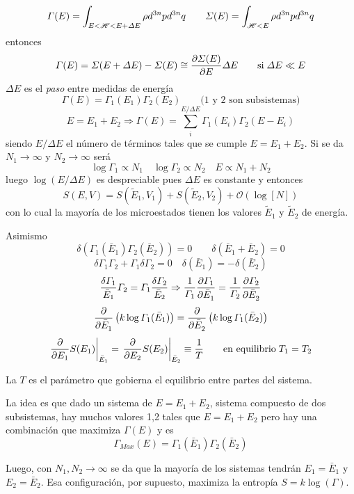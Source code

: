 \documentclass[10pt,oneside]{CBFT_book}
\begin{document}
\[
	\Gamma(E) = \int_{E < \mathscr{H} < E + \Delta E} \rho d^{3n}p d^{3n}q \qquad 
	\Sigma(E) = \int_{\mathscr{H} < E} \rho d^{3n}p d^{3n}q
\]
entonces 
\[
	\Gamma(E) = \Sigma( E + \Delta E ) - \Sigma( E ) \cong \frac{\partial^{\hspace{-0.05em}} {\Sigma( E )}}{\partial {E}^{\hspace{-0.05em}}}\Delta E  
	\qquad \text{si}\; \Delta E \ll E
\]
$\Delta E$ es el {\it paso} entre medidas de energía 
\[
	\Gamma(E) = \Gamma_1(E_1) \Gamma_2(E_2) \qquad \text{(1 y 2 son subsistemas)}
\]
\[
	E = E_1 + E_2 \Rightarrow \Gamma(E) = \sum_i^{E/\Delta E} \Gamma_1(E_i)\Gamma_2(E-E_i)
\]
siendo $E/\Delta E$ el número de términos tales que se cumple $ E = E_1 + E_2 $.
Si se da $ N_1 \to \infty $ y $ N_2 \to \infty $ será
\[
	\log \Gamma_1 \propto N_1 \quad \log \Gamma_2 \propto N_2 \quad E \propto N_1 + N_2
\]
luego $\log(E/\Delta E)$ es despreciable pues $\Delta E$ es constante y entonces
\[
	S(E,V) = S(\tilde{E}_1,V_1) + S(\tilde{E}_2,V_2) + \mathcal{O}(\log[N])
\]
con lo cual la mayoría de los microestados tienen los valores $\tilde{E}_1$ y $\tilde{E}_2$ de energía.

Asimismo
\[
	\delta( \Gamma_1(\bar{E}_1)  \Gamma_2(\bar{E}_2) ) = 0 \qquad \delta( \bar{E}_1 + \bar{E}_2 ) = 0
\]
\[
	\delta\Gamma_1 \Gamma_2 + \Gamma_1 \delta \Gamma_2 = 0 \quad \delta( \bar{E}_1 ) = -\delta ( \bar{E}_2 )
\]
\[
	\frac{\delta\Gamma_1}{\bar{E}_1}\Gamma_2 = \Gamma_1\frac{\delta\Gamma_2}{\bar{E}_2} \Rightarrow 
	\frac{1}{\Gamma_1} \frac{\partial^{\hspace{-0.05em}} {\Gamma_1}}{\partial {\bar{E}_1}^{\hspace{-0.05em}}} = \frac{1}{\Gamma_2} \frac{\partial^{\hspace{-0.05em}} {\Gamma_2}}{\partial {\bar{E}_2}^{\hspace{-0.05em}}} 
\]
\[
	\frac{\partial^{\hspace{-0.05em}} {}}{\partial {\bar{E}_1}^{\hspace{-0.05em}}}\left( k\log \Gamma_1(\bar{E}_1) \right) = 
	\frac{\partial^{\hspace{-0.05em}} {}}{\partial {\bar{E}_2}^{\hspace{-0.05em}}}\left( k\log \Gamma_1(\bar{E}_2) \right)
\]
\[
	\left. \frac{\partial^{\hspace{-0.05em}} {}}{\partial {{E}_1}^{\hspace{-0.05em}}}S(E_1)\right|_{\bar{E}_1} = \left. \frac{\partial^{\hspace{-0.05em}} {}}{\partial {{E}_2}^{\hspace{-0.05em}}}S(E_2)\right|_{\bar{E}_2}
	\equiv \frac{1}{T} \qquad \text{en equilibrio} \; T_1 = T_2
\]

La $T$ es el parámetro que gobierna el equilibrio entre partes del sistema.

La idea es que dado un sistema de $E = E_1 + E_2$, sistema compuesto de dos subsistemas, hay muchos valores
1,2 tales que $E = E_1 + E_2$ pero hay una combinación que maximiza $\Gamma(E)$ y es
\[
	\Gamma_{Max}(E) = \Gamma_1(\bar{E}_1)  \Gamma_2(\bar{E}_2) 
\]

Luego, con $N_1, N_2 \to \infty$ se da que la mayoría de los sistemas tendrán $E_1=\bar{E}_1$ y $E_2=\bar{E}_2$.
Esa configuración, por supuesto, maximiza la entropía $S=k\log(\Gamma)$.
\end{document}
